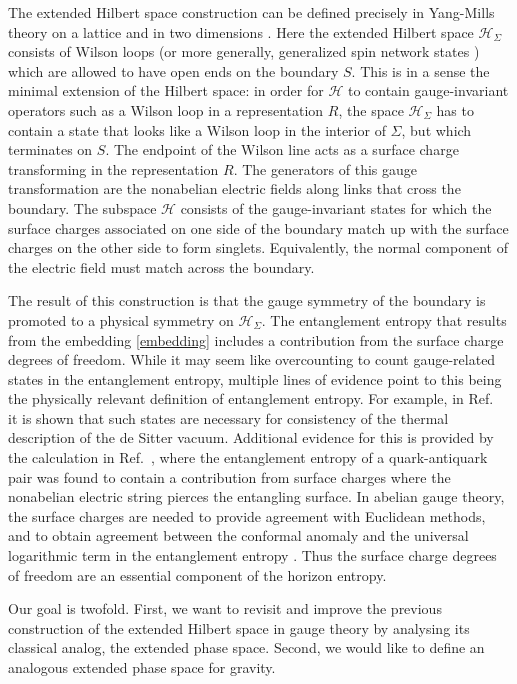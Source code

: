 \documentclass[a4paper,11pt]{article}
\begin{document}
The extended Hilbert space construction can be defined precisely in Yang-Mills theory on a lattice \cite{Donnelly2011} and in two dimensions \cite{Donnelly:2014gva}.
Here the extended Hilbert space $\mathcal{H}_\Sigma$ consists of Wilson loops (or more generally, generalized spin network states \cite{Donnelly2011}) which are allowed to have open ends on the boundary $S$.
This is in a sense the minimal extension of the Hilbert space: in order for $\mathcal{H}$ to contain gauge-invariant operators such as a Wilson loop in a representation $R$, the space $\mathcal{H}_\Sigma$ has to contain a state that looks like a Wilson loop in the interior of $\Sigma$, but which terminates on $S$.
The endpoint of the Wilson line acts as a surface charge transforming in the representation $R$.
The generators of this gauge transformation are the nonabelian electric fields along links that cross the boundary.
The subspace $\mathcal{H}$ consists of the gauge-invariant states for which the surface charges associated on one side of the boundary match up with the surface charges on the other side to form singlets.
Equivalently, the normal component of the electric field must match across the boundary.

The result of this construction is that the gauge symmetry of the boundary is promoted to a physical symmetry on $\mathcal{H}_\Sigma$.
The entanglement entropy that results from the embedding \eqref{embedding} includes a contribution from the surface charge degrees of freedom.
While it may seem like overcounting to count gauge-related states in the entanglement entropy, multiple lines of evidence point to this being the physically relevant definition of entanglement entropy. 
For example, in Ref.~\cite{Donnelly:2014gva} it is shown that such states are necessary for consistency of the thermal description of the de Sitter vacuum.
Additional evidence for this is provided by the calculation in Ref.~\cite{Lewkowycz2013}, where the entanglement entropy of a quark-antiquark pair was found to contain a contribution from surface charges where the nonabelian electric string pierces the entangling surface.
In abelian gauge theory, the surface charges are needed to provide agreement with Euclidean methods, and to obtain agreement between the conformal anomaly and the universal logarithmic term in the entanglement entropy \cite{Donnelly:2014fua,Donnelly:2015hxa}.
Thus the surface charge degrees of freedom are an essential component of the horizon entropy.

Our goal is twofold.
First, we want to revisit and improve the previous construction of the extended Hilbert space in gauge theory by analysing its classical analog, the extended phase space. 
Second, we would like to define an analogous extended phase space for gravity. 
\end{document}
